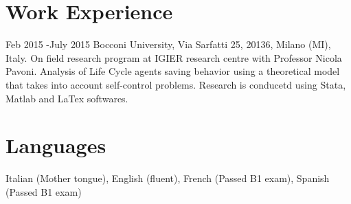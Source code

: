 \documentclass[10pt]{article} %
\begin{document}







\section{Work Experience}


\job
{Feb 2015 -}{July 2015}
{Bocconi University, Via Sarfatti 25, 20136, Milano (MI), Italy.}{}
{On field research program at IGIER research centre with Professor Nicola Pavoni.
}{Analysis of Life Cycle agents saving behavior using a theoretical model that takes into account self-control problems. Research is conducetd using Stata, Matlab and LaTex softwares.}
\small

\section{Languages}
Italian (Mother tongue), English (fluent), French (Passed B1 exam), Spanish (Passed B1 exam)

\end{document}
